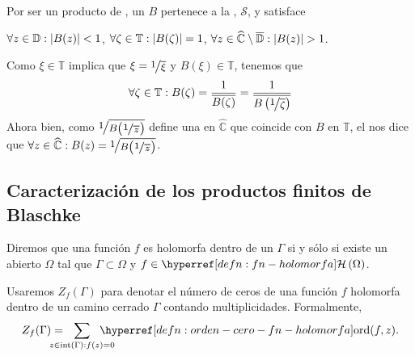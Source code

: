 \begin{obs}\label{obs:prod-finito-blaschke-clase-schur}
    Por ser un producto de , un  $B$ pertenece a la , $\mathscr{S}$, y satisface
    \begin{enu}[1][label=(\arabic*), ref=\arabic*]
        \item $\forall z \in \mathbb{D} : \left|B(z)\right| < 1$,
        \inlineitem $\forall \zeta \in \mathbb{T} : \left|B(\zeta)\right| = 1$,
        \inlineitem $\forall z \in \widehat{\mathbb{C}} \setminus \overline{\mathbb{D}} : \left|B(z)\right| > 1$.
    \end{enu}

    Como $\xi \in \mathbb{T}$ implica que $\xi = \sfrac{1}{\bar{\xi}}$ y $B(\xi) \in \mathbb{T}$, tenemos que
    \[
    \forall \zeta \in \mathbb{T} : \ds B(\zeta) = \frac{1}{\bar{B(\zeta)}} = \frac{1}{\bar{B \left(\sfrac{1}{\bar{\zeta}}\right)}}
    \]
    Ahora bien, como $\sfrac{1}{\bar{B \left(\sfrac{1}{\bar{z}}\right)}}$ define una  en $\widehat{\mathbb{C}}$ que coincide con $B$ en $\mathbb{T}$, el  nos dice que $\forall z \in \widehat{\mathbb{C}} : B(z) = \sfrac{1}{\bar{B \left(\sfrac{1}{\bar{z}}\right)}}$.
\end{obs}

\subsection{Caracterización de los productos finitos de Blaschke}

\begin{defn}\label{defn:fn-holomorfa-dentro-camino}
    Diremos que una función $f$ es holomorfa dentro de un   $\Gamma$ si y sólo si existe un abierto $\Omega$  tal que $\Gamma \subset \Omega$ y $f \in \exhyperref[defn:fn-holomorfa]{fn-holomorfa}{\mathcal{H}} \left(\Omega\right)$.
\end{defn}

\begin{defn}\label{defn:numero-ceros-fn-holomorfa-camino}
    Usaremos $Z_f(\Gamma)$ para denotar el número de ceros de una función $f$ holomorfa dentro de un camino cerrado $\Gamma$ contando multiplicidades. Formalmente,
    \[
    Z_f(\Gamma) = \!\!\!\!\!\!\!\!\! \sum_{z \in \operatorname{int}(\Gamma) : f(z) = 0} \!\!\!\!\!\!\!\!\! \exhyperref[defn:orden-cero-fn-holomorfa]{orden-cero-fn-holomorfa}{\operatorname{ord}}(f, z).
    \]
\end{defn}

